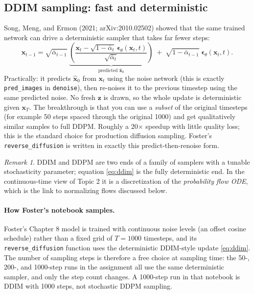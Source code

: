 \documentclass[11pt]{article}
\theoremstyle{remark}
\newtheorem*{remark}{Remark}
\begin{document}
\subsection{DDIM sampling: fast and deterministic}

Song, Meng, and Ermon (2021; arXiv:2010.02502) showed that the same trained network can drive a deterministic sampler that takes far fewer steps:
\begin{equation}
\mathbf{x}_{t-1} = \sqrt{\bar{\alpha}_{t-1}}\; \underbrace{\left(\frac{\mathbf{x}_t - \sqrt{1 - \bar{\alpha}_t}\, \boldsymbol{\epsilon}_\theta(\mathbf{x}_t, t)}{\sqrt{\bar{\alpha}_t}}\right)}_{\text{predicted } \hat{\mathbf{x}}_0} \;+\; \sqrt{1 - \bar{\alpha}_{t-1}}\; \boldsymbol{\epsilon}_\theta(\mathbf{x}_t, t).
\label{eq:ddim}
\end{equation}
Practically: it predicts $\hat{\mathbf{x}}_0$ from $\mathbf{x}_t$ using the noise network (this is exactly \texttt{pred\_images} in \texttt{denoise}), then re-noises it to the previous timestep using the same predicted noise. No fresh $\mathbf{z}$ is drawn, so the whole update is deterministic given $\mathbf{x}_T$. The breakthrough is that you can use a \emph{subset} of the original timesteps (for example 50 steps spaced through the original 1000) and get qualitatively similar samples to full DDPM. Roughly a 20$\times$ speedup with little quality loss; this is the standard choice for production diffusion sampling. Foster's \texttt{reverse\_diffusion} is written in exactly this predict-then-renoise form.

\begin{remark}
DDIM and DDPM are two ends of a family of samplers with a tunable stochasticity parameter; equation \eqref{eq:ddim} is the fully deterministic end. In the continuous-time view of Topic 2 it is a discretization of the \emph{probability flow ODE}, which is the link to normalizing flows discussed below.
\end{remark}

\paragraph{How Foster's notebook samples.} Foster's Chapter 8 model is trained with continuous noise levels (an offset cosine schedule) rather than a fixed grid of $T = 1000$ timesteps, and its \texttt{reverse\_diffusion} function uses the deterministic DDIM-style update \eqref{eq:ddim}. The number of sampling steps is therefore a free choice at sampling time: the 50-, 200-, and 1000-step runs in the assignment all use the same deterministic sampler, and only the step count changes. A 1000-step run in that notebook is DDIM with 1000 steps, not stochastic DDPM sampling.
\end{document}
